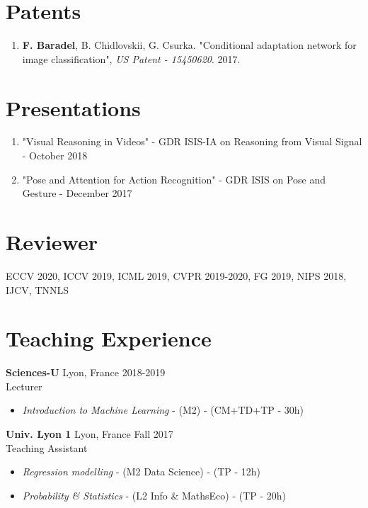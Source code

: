 \documentclass[10pt]{res} %
\begin{document}
\begin{resume}
\section{\large Patents}
\begin{enumerate}[wide=0pt]
	\item \textbf{F. Baradel}, B. Chidlovskii, G. Csurka. "Conditional adaptation network for image classification",  \textit{US Patent - 15450620}. 2017.
\end{enumerate}

\section{\large Presentations}
\begin{enumerate}[wide=0pt]
	\item "Visual Reasoning in Videos" - GDR ISIS-IA on Reasoning from Visual Signal - October 2018
	\item "Pose and Attention for Action Recognition" - GDR ISIS on Pose and Gesture - December 2017
\end{enumerate}

\section{\large Reviewer}  
ECCV 2020, ICCV 2019, ICML 2019, CVPR 2019-2020, FG 2019, NIPS 2018, IJCV, TNNLS

\section{\large Teaching Experience}
\textbf{Sciences-U} \hfill Lyon, France \hfill 2018-2019 \\
Lecturer
\begin{itemize}
	\item \textit{Introduction to Machine Learning} - (M2) - (CM+TD+TP - 30h)
\end{itemize}

\textbf{Univ. Lyon 1} \hfill Lyon, France \hfill Fall 2017 \\
Teaching Assistant
\begin{itemize}
	\item \textit{Regression modelling}  - (M2 Data Science) - (TP - 12h)
	\item \textit{Probability \& Statistics}  - (L2 Info \& MathsEco) - (TP - 20h)
\end{itemize}


\end{resume}
\end{document}

